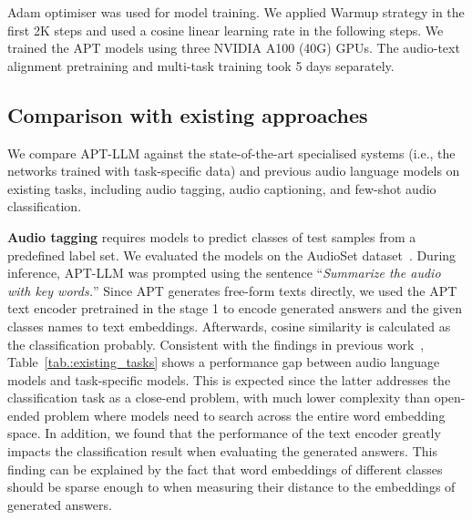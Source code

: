 \documentclass{article} %
\begin{document}
Adam optimiser was used for model training. We applied Warmup strategy in the first 2K steps and used a cosine linear learning rate in the following steps. We trained the APT models using three NVIDIA A100 (40G) GPUs. The audio-text alignment pretraining and multi-task training took 5 days separately.

\subsection{Comparison with existing approaches} \label{subsec:comparison_with_existing_approaches}
We compare APT-LLM against the state-of-the-art specialised systems (i.e., the networks trained with task-specific data) and previous audio language models on existing tasks, including audio tagging, audio captioning, and few-shot audio classification.

\textbf{Audio tagging} requires models to predict classes of test samples from a predefined label set. We evaluated the models on the AudioSet dataset~\citep{gemmeke_audio_2017}. During inference, APT-LLM was prompted using the sentence ``\textit{Summarize the audio with key words.}'' Since APT generates free-form texts directly, we used the APT text encoder pretrained in the stage 1 to encode generated answers and the given classes names to text embeddings. Afterwards, cosine similarity is calculated as the classification probably.
Consistent with the findings in previous work~\citep{gong_listen_2023}, Table~\ref{tab.:existing_tasks} shows a performance gap between audio language models and task-specific models. This is expected since the latter addresses the classification task as a close-end problem, with much lower complexity than open-ended problem where models need to search across the entire word embedding space. In addition, we found that the performance of the text encoder greatly impacts the classification result when evaluating the generated answers. This finding can be explained by the fact that  word embeddings of different classes should be sparse enough to when measuring their distance to the embeddings of generated answers.
\end{document}
